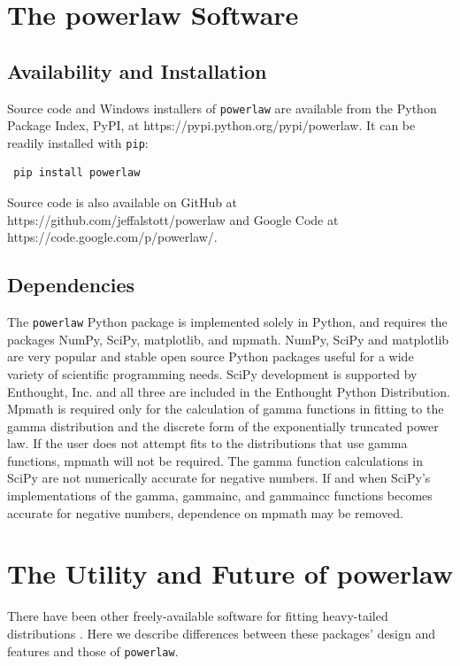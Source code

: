 \documentclass[10pt]{article}
\begin{document}
 \section*{The powerlaw Software}
 \subsection*{Availability and Installation}
 Source code and Windows installers of \verb$powerlaw$ are available from the Python Package Index, PyPI, at https://pypi.python.org/pypi/powerlaw. It can be readily installed with \verb$pip$:
 
 \begin{verbatim}
 pip install powerlaw
 \end{verbatim}
 
 Source code is also available on GitHub at https://github.com/jeffalstott/powerlaw and Google Code at https://code.google.com/p/powerlaw/.
 
 \subsection*{Dependencies}
The \verb$powerlaw$ Python package is implemented solely in Python, and requires the packages NumPy, SciPy, matplotlib, and mpmath. NumPy, SciPy and matplotlib are very popular and stable open source Python packages useful for a wide variety of scientific programming needs. SciPy development is supported by Enthought, Inc. and all three are included in the Enthought Python Distribution. Mpmath is required only for the calculation of gamma functions in fitting to the gamma distribution and the discrete form of the exponentially truncated power law. If the user does not attempt fits to the distributions that use gamma functions, mpmath will not be required. The gamma function calculations in SciPy are not numerically accurate for negative numbers. If and when SciPy's implementations of the gamma, gammainc, and gammaincc functions becomes accurate for negative numbers, dependence on mpmath may be removed.
 
 \section*{The Utility and Future of powerlaw}
 There have been other freely-available software for fitting heavy-tailed distributions \cite{Clauset2009, Ginsburg2012}. Here we describe differences between these packages' design and features and those of \verb$powerlaw$.
 
\end{document}
